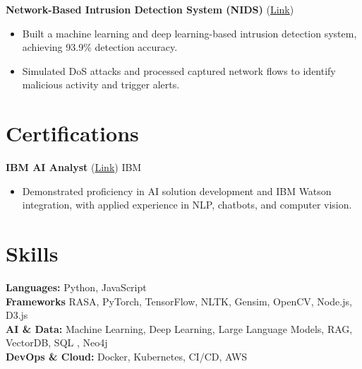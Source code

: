 \documentclass[10pt]{article}
\begin{document}
\noindent \textbf{Network-Based Intrusion Detection System (NIDS)} (\href{https://github.com/prasham1515/NIDS-Using-CICIDS2017-Dataset}{Link})
\begin{itemize}
  \item Built a machine learning and deep learning-based intrusion detection system, achieving 93.9\% detection accuracy.
  \item Simulated DoS attacks and processed captured network flows to identify malicious activity and trigger alerts.
\end{itemize}


\section*{Certifications}

\noindent \textbf{IBM AI Analyst} (\href{https://courses.ibmcep.cognitiveclass.ai/certificates/97ea27a2a34044c38f2a6c346a2c2703}{Link}) \hfill IBM 
\begin{itemize}
  \item Demonstrated proficiency in AI solution development and IBM Watson integration, with applied experience in NLP, chatbots, and computer vision.
\end{itemize}


\section*{Skills}

\noindent \textbf{Languages:} Python, JavaScript \\
\textbf{Frameworks} RASA, PyTorch, TensorFlow, NLTK, Gensim, OpenCV, Node.js, D3.js \\
\textbf{AI \& Data:} Machine Learning, Deep Learning, Large Language Models, RAG, VectorDB, SQL , Neo4j\\
\textbf{DevOps \& Cloud:} Docker, Kubernetes, CI/CD, AWS
\end{document}
